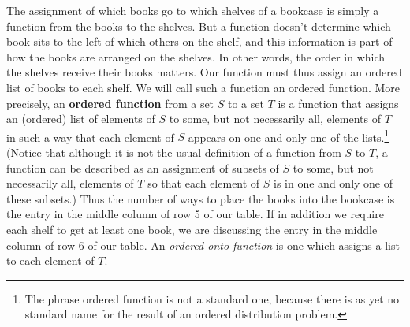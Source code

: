 

\ep
The assignment of which books go to which shelves of a bookcase is simply
a function from the books to the shelves.  But a function doesn't
determine which book sits to the left of which others on the shelf, and
this information is part of how the books are arranged on the shelves.  In
other words, the order in which the shelves receive their books matters. 
Our function must thus assign an ordered list of books to each shelf.  We
will call such a function an ordered function.  More precisely, an {\bf
ordered function} from a
set $S$ to a set $T$ is a function that assigns an (ordered) list of
elements of
$S$ to some, but not necessarily all, elements of $T$ in such a way that
each element of $S$ appears on one and only one of the lists.\footnote{The phrase ordered function is not a
standard one, because there is as yet no standard name for the result of
an ordered distribution problem.}  (Notice that although it is not the
usual definition of a function from $S$ to $T$, a
function can be described as an
assignment of  subsets of $S$ to some, but not necessarily all, elements
of $T$ so that each element of $S$ is in one and only one of these
subsets.) Thus the number of ways to place the books into the bookcase is
the entry in the middle column of row 5 of our table.  If in addition we
require each shelf to get at least one book, we are discussing the entry
in the middle column of row 6 of our table.  An {\em ordered onto
function} is one which assigns a list to
each element of $T$.  \label{orderedfunctionsection}

